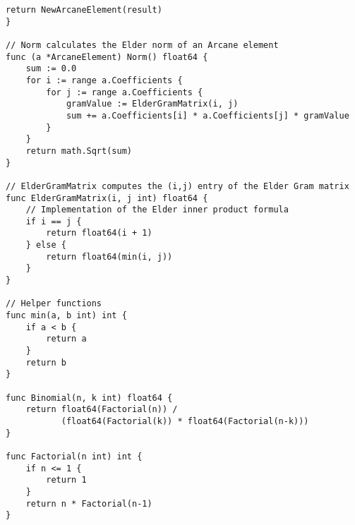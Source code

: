 \begin{lstlisting}[language=golang, caption={Implementation of Elder Algebra in GoLang}]
    return NewArcaneElement(result)
}

// Norm calculates the Elder norm of an Arcane element
func (a *ArcaneElement) Norm() float64 {
    sum := 0.0
    for i := range a.Coefficients {
        for j := range a.Coefficients {
            gramValue := ElderGramMatrix(i, j)
            sum += a.Coefficients[i] * a.Coefficients[j] * gramValue
        }
    }
    return math.Sqrt(sum)
}

// ElderGramMatrix computes the (i,j) entry of the Elder Gram matrix
func ElderGramMatrix(i, j int) float64 {
    // Implementation of the Elder inner product formula
    if i == j {
        return float64(i + 1)
    } else {
        return float64(min(i, j))
    }
}

// Helper functions
func min(a, b int) int {
    if a < b {
        return a
    }
    return b
}

func Binomial(n, k int) float64 {
    return float64(Factorial(n)) / 
           (float64(Factorial(k)) * float64(Factorial(n-k)))
}

func Factorial(n int) int {
    if n <= 1 {
        return 1
    }
    return n * Factorial(n-1)
}
\end{lstlisting}

